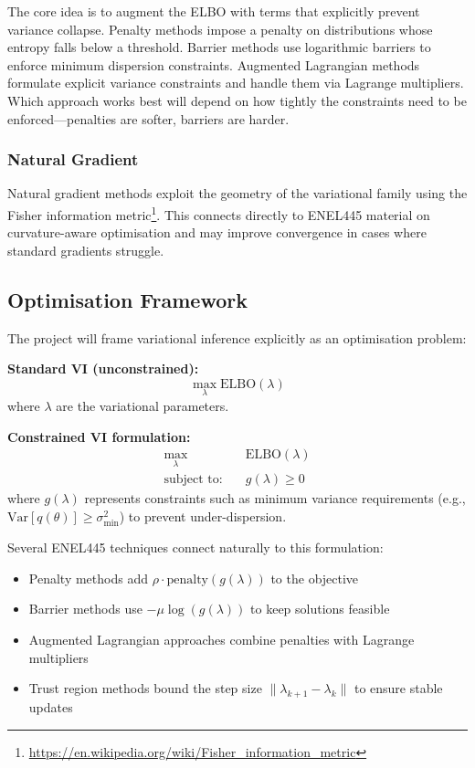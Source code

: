 \documentclass[11pt,a4paper]{article}
\begin{document}
The core idea is to augment the ELBO with terms that explicitly prevent variance collapse. Penalty methods impose a penalty on distributions whose entropy falls below a threshold. Barrier methods use logarithmic barriers to enforce minimum dispersion constraints. Augmented Lagrangian methods formulate explicit variance constraints and handle them via Lagrange multipliers. Which approach works best will depend on how tightly the constraints need to be enforced---penalties are softer, barriers are harder.

\subsubsection*{Natural Gradient}

Natural gradient methods exploit the geometry of the variational family using the Fisher information metric\footnote{\url{https://en.wikipedia.org/wiki/Fisher_information_metric}}. This connects directly to ENEL445 material on curvature-aware optimisation and may improve convergence in cases where standard gradients struggle.

\subsection{Optimisation Framework}

The project will frame variational inference explicitly as an optimisation problem:

\textbf{Standard VI (unconstrained):}
\[
\max_{\lambda} \text{ELBO}(\lambda)
\]
where $\lambda$ are the variational parameters.

\textbf{Constrained VI formulation:}
\[
\begin{aligned}
\max_{\lambda} \quad & \text{ELBO}(\lambda) \\
\text{subject to:} \quad & g(\lambda) \geq 0
\end{aligned}
\]
where $g(\lambda)$ represents constraints such as minimum variance requirements (e.g., $\text{Var}[q(\theta)] \geq \sigma^2_{\text{min}}$) to prevent under-dispersion.

Several ENEL445 techniques connect naturally to this formulation:
\begin{itemize}[nosep]
\item Penalty methods add $\rho \cdot \text{penalty}(g(\lambda))$ to the objective
\item Barrier methods use $-\mu \log(g(\lambda))$ to keep solutions feasible
\item Augmented Lagrangian approaches combine penalties with Lagrange multipliers
\item Trust region methods bound the step size $\|\lambda_{k+1} - \lambda_k\|$ to ensure stable updates
\end{itemize}
\end{document}
